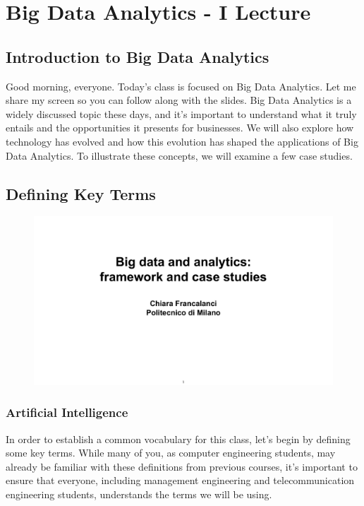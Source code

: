 \section{Big Data Analytics - I Lecture}

\subsection{Introduction to Big Data
  Analytics}\label{introduction-to-big-data-analytics}

Good morning, everyone. Today's class is focused on Big Data Analytics.
Let me share my screen so you can follow along with the slides. Big Data
Analytics is a widely discussed topic these days, and it's important to
understand what it truly entails and the opportunities it presents for
businesses. We will also explore how technology has evolved and how this
evolution has shaped the applications of Big Data Analytics. To
illustrate these concepts, we will examine a few case studies.


\subsection{Defining Key Terms}\label{defining-key-terms}

\begin{figure}[!h]
  \centering
  \includegraphics[page=4, trim = 1.5cm 4cm 1.5cm 4cm, clip, width=\imagewidth]{images/06 - BIG_DATA.pdf}
\end{figure}

\subsubsection{Artificial Intelligence}\label{artificial-intelligence}

In order to establish a common vocabulary for this class, let's begin by
defining some key terms. While many of you, as computer engineering
students, may already be familiar with these definitions from previous
courses, it's important to ensure that everyone, including management
engineering and telecommunication engineering students, understands the
terms we will be using.

